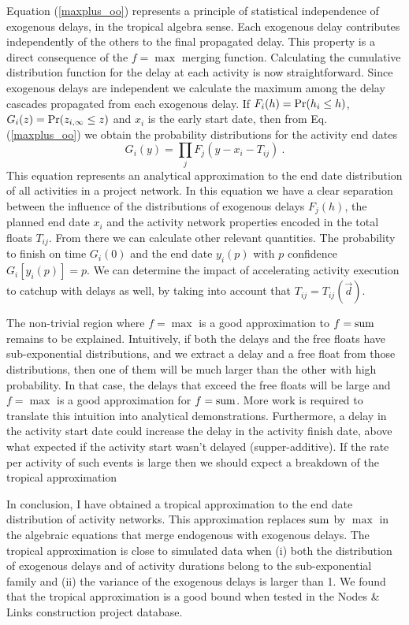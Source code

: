 \documentclass[reprint,aps,prl,amsmath,amssymb,superscriptaddress,showpacs]{revtex4-1}
\begin{document}
Equation (\ref{maxplus_oo}) represents a principle of statistical independence of exogenous delays, in the tropical algebra sense. Each exogenous delay contributes independently of the others to the final propagated delay. This property is a direct consequence of the $f=\max$ merging function. Calculating the cumulative distribution function for the delay at each activity is now straightforward. Since exogenous delays are independent we calculate the maximum among the delay cascades propagated from each exogenous delay.  If $F_i(h)={\rm Pr}(h_i\leq h)$, $G_i(z) = {\rm Pr}(z_{i,\infty}\leq z)$ and $x_i$ is the early start date, then from Eq. (\ref{maxplus_oo}) we obtain the probability distributions for the activity end dates
%
\begin{equation}
G_i(y) = \prod_{j} F_j(y-x_i-T_{ij})\ .
\label{CDF}
\end{equation}
%
This equation represents an analytical approximation to the end date distribution of all activities in a project network. In this equation we have a clear separation between the influence of the distributions of exogenous delays $F_j(h)$, the planned end date $x_i$ and the activity network properties encoded in the total floats $T_{ij}$. From there we can calculate other relevant quantities. The probability to finish on time $G_i(0)$ and the end date $y_i(p)$ with $p$ confidence $G_i[y_i(p)]=p$. We can determine the impact of accelerating activity execution to catchup with delays as well, by taking into account that $T_{ij}=T_{ij}(\vec{d})$.

The non-trivial region where $f=\max$ is a good approximation to $f={\rm sum}$ remains to be explained. Intuitively, if both the delays and the free floats have sub-exponential distributions, and we extract a delay and a free float from those distributions, then one of them will be much larger than the other with high probability. In that case, the delays that exceed the free floats will be large and $f=\max$ is a good approximation for $f={\rm sum}$. More work is required to translate this intuition into analytical demonstrations. Furthermore, a delay in the activity start date could increase the delay in the activity finish date, above what expected if the activity start wasn't delayed (supper-additive). If the rate per activity of such events is large then we should expect a breakdown of the tropical approximation

In conclusion, I have obtained a tropical approximation to the end date distribution of activity networks. This approximation replaces ${\rm sum}$ by $\max$ in the algebraic equations that merge endogenous with exogenous delays. The tropical approximation is close to simulated data when (i) both the distribution of exogenous delays and of activity durations belong to the sub-exponential family and (ii) the variance of the exogenous delays is larger than 1. We found that the tropical approximation is a good bound when tested in the Nodes \& Links construction project database.
\end{document}
